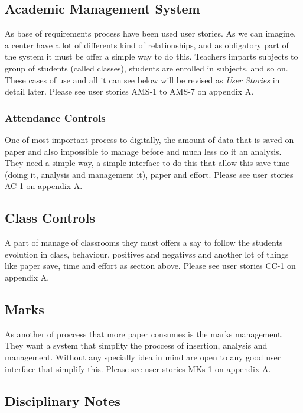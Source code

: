 \subsection{Academic Management System}

As base of requirements process have been used user stories.
As we can imagine, a center have a lot of differents kind of relationships,
and as obligatory part of the system it must be offer a simple way to do this.
Teachers imparts subjects to group of students (called classes), students are
enrolled in subjects, and so on. These cases of use and all it can see below will
be revised as \textit{User Stories} in detail later.
\intro
Please see user stories AMS-1 to AMS-7 on appendix A.

\subsubsection{Attendance Controls}

One of most important process to digitally, the amount of data that is saved on
paper and also impossible to manage before and much less do it an analysis.
They need a simple way, a simple interface to do this that allow this save time
(doing it, analysis and management it), paper and effort.
\intro
Please see user stories AC-1 on appendix A.

\subsection{Class Controls}

A part of manage of classrooms they must offers a say to follow the students evolution in class, behaviour, positives and negativss and another lot of things like paper save, time and effort as section above.
\intro
Please see user stories CC-1 on appendix A.

\subsection{Marks}

As another of proccess that more paper consumes is the marks management. They want a system that simplity the proccess of insertion, analysis and management. Without any specially idea in mind are open to any good user interface that simplify this.
\intro
Please see user stories MKs-1 on appendix A.

\subsection{Disciplinary Notes}
\

